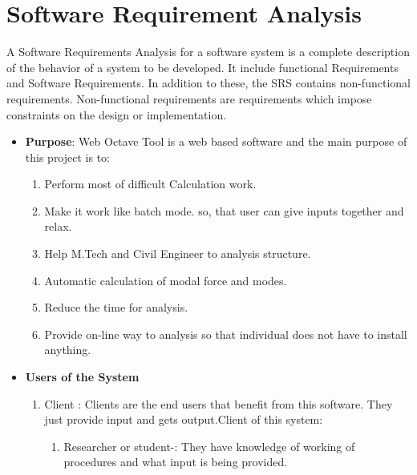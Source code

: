 
\section{Software Requirement Analysis}

A Software Requirements Analysis for a software system is a complete 
description of the behavior of a system to be developed. It include functional Requirements
and Software Requirements. In addition to these, the SRS contains 
non-functional requirements. Non-functional requirements are 
requirements which impose constraints on the design or implementation.
\begin{itemize}
\item{\bf Purpose}: Web Octave Tool is a web based software and the main purpose of this project is to:
\begin{enumerate}
\item Perform most of difficult Calculation work.
\item Make it work like batch mode. so, that user can give inputs 
together and relax.
\item Help M.Tech and Civil Engineer to analysis structure.
\item Automatic calculation of modal force and modes.
\item Reduce the time for analysis.
\item Provide on-line way to analysis so that individual does not have to 
install anything.
\end{enumerate}

\item{\bf Users of the System}
\begin{enumerate} 
\item Client : Clients are the end users that benefit from this software.
They just provide input and gets output.Client of this system:
\begin{enumerate}
\item Researcher or student-: They have knowledge of working of procedures and what input is being provided.  
\end{enumerate}
\end{enumerate}
\end{itemize}

